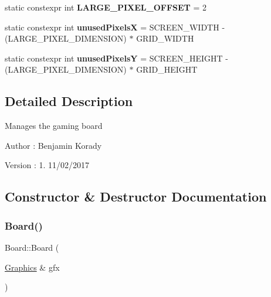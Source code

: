 \begin{DoxyCompactItemize}
\item 
\mbox{\label{class_board_ae9697a8aec0c7287651f758590e286c2}} 
static constexpr int {\bfseries L\+A\+R\+G\+E\+\_\+\+P\+I\+X\+E\+L\+\_\+\+O\+F\+F\+S\+ET} = 2
\item 
\mbox{\label{class_board_a40ede8b5ef707e33c5e5423376ba0680}} 
static constexpr int {\bfseries unused\+PixelsX} = S\+C\+R\+E\+E\+N\+\_\+\+W\+I\+D\+TH -\/ (L\+A\+R\+G\+E\+\_\+\+P\+I\+X\+E\+L\+\_\+\+D\+I\+M\+E\+N\+S\+I\+ON) $\ast$ G\+R\+I\+D\+\_\+\+W\+I\+D\+TH
\item 
\mbox{\label{class_board_a4e101f3a2d9dc6f1b001bb7764d58ff7}} 
static constexpr int {\bfseries unused\+PixelsY} = S\+C\+R\+E\+E\+N\+\_\+\+H\+E\+I\+G\+HT -\/ (L\+A\+R\+G\+E\+\_\+\+P\+I\+X\+E\+L\+\_\+\+D\+I\+M\+E\+N\+S\+I\+ON) $\ast$ G\+R\+I\+D\+\_\+\+H\+E\+I\+G\+HT
\end{DoxyCompactItemize}


\subsection{Detailed Description}
Manages the gaming board

\begin{DoxyAuthor}{Author}
\+: Benjamin Korady 
\end{DoxyAuthor}
\begin{DoxyVersion}{Version}
\+: 1. 11/02/2017 
\end{DoxyVersion}


\subsection{Constructor \& Destructor Documentation}
\mbox{\label{class_board_a46374cb53089d5abbf7609234dca4828}} 
\subsubsection{\texorpdfstring{Board()}{Board()}}
{\footnotesize\ttfamily Board\+::\+Board (\begin{DoxyParamCaption}\item[{\hyperlink{class_graphics}{Graphics} \&}]{gfx }\end{DoxyParamCaption})}

